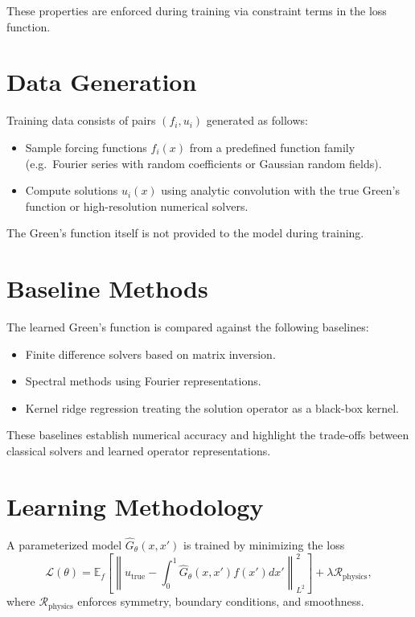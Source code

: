 \documentclass[11pt]{article}
\begin{document}
These properties are enforced during training via constraint terms in the loss
function.

\section{Data Generation}

Training data consists of pairs $(f_i, u_i)$ generated as follows:
\begin{itemize}
\item Sample forcing functions $f_i(x)$ from a predefined function family
(e.g.\ Fourier series with random coefficients or Gaussian random fields).
\item Compute solutions $u_i(x)$ using analytic convolution with the true Green's
function or high-resolution numerical solvers.
\end{itemize}

The Green's function itself is not provided to the model during training.

\section{Baseline Methods}

The learned Green's function is compared against the following baselines:
\begin{itemize}
\item Finite difference solvers based on matrix inversion.
\item Spectral methods using Fourier representations.
\item Kernel ridge regression treating the solution operator as a black-box kernel.
\end{itemize}

These baselines establish numerical accuracy and highlight the trade-offs between
classical solvers and learned operator representations.

\section{Learning Methodology}

A parameterized model $\hat{G}_\theta(x,x')$ is trained by minimizing the loss
\begin{equation}
\mathcal{L}(\theta) =
\mathbb{E}_{f} \left[
\left\| u_{\text{true}} -
\int_0^1 \hat{G}_\theta(x,x') f(x') dx'
\right\|_{L^2}^2
\right]
+ \lambda \mathcal{R}_{\text{physics}},
\end{equation}
where $\mathcal{R}_{\text{physics}}$ enforces symmetry, boundary conditions, and
smoothness.
\end{document}

